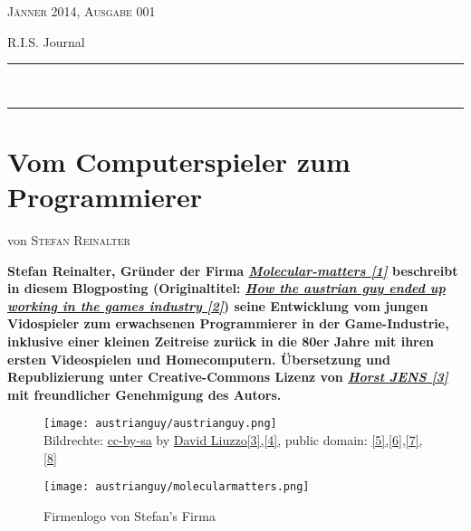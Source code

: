 \documentclass[10pt,a4paper,ngerman,twoside]{article} %
\newcommand{\HorRule}[1]{\noindent\rule{\linewidth}{#1}} %
\newcommand{\NewsletterName}[1]{ %
\begin{center}
\Huge \usefont{T1}{fvs}{b}{n} %
#1
\end{center}	
\par \normalsize \normalfont}
\newcommand{\JournalIssue}[1]{ %
\hfill \textsc{Jänner 2014, Ausgabe 001}
\par \normalsize \normalfont}
\newcommand{\NewsItem}[1]{ %
\usefont{T1}{fvs}{n}{n} %
\vspace{24pt}\large #1\vspace{3pt} %
\par \normalsize \normalfont}
\newcommand{\NewsAuthor}[1]{ %
\hfill von \textsc{#1} \vspace{20pt} %
\par \normalfont}
\begin{document}
\JournalIssue{1} %
\NewsletterName{R.I.S. Journal} %
\noindent\HorRule{3pt} \\[-0.75\baselineskip] %
\HorRule{1pt} %




%
 
\NewsItem{}
\section*{Vom Computerspieler zum Programmierer} 
\label{austrianguy}
\NewsAuthor{Stefan Reinalter}

\textbf{Stefan Reinalter, Gründer der Firma \href{http://www.molecular-matters.com/}{\textit{Molecular-matters [1]}} beschreibt in diesem Blogposting (Originaltitel: \href{http://www.altdevblogaday.com/2011/09/27/how-the-austrian-guy-ended-up-working-in-the-games-industry/}{\textit{How the austrian guy ended up working in the games industry [2]}}) seine Entwicklung vom jungen Vidospieler zum erwachsenen Programmierer in der Game-Industrie, inklusive einer kleinen Zeitreise zurück in die 80er Jahre mit ihren ersten Videospielen und Homecomputern. Übersetzung und Republizierung unter Creative-Commons Lizenz von \href{http://spielend-programmieren.at}{\textit{Horst JENS [3]}} mit freundlicher Genehmigung des Autors.}
\begin{figure}
\texttt{[image: austrianguy/austrianguy.png]} \\
\caption{Bildrechte: \href{https://creativecommons.org/licenses/by-sa/4.0/deed.en}{cc-by-sa} by \href{https://commons.wikimedia.org/wiki/User:David_Liuzzo}{David Liuzzo[3],}\href{https://commons.wikimedia.org/wiki/File:EU_location_AUT.png}{[4],} public domain: \href{http://openclipart.org/detail/175351/playstation-controller-by-matthewhenninger-175351}{[5],}\href{http://openclipart.org/detail/21847/comic-characters:-bearded-guy-by-nicubunu}{[6],}\href{http://openclipart.org/detail/7885/blue-world-map-by-neocreo}{[7],}\href{http://openclipart.org/detail/12612/flag-of-austria-by-anonymous}{[8]}}
\texttt{[image: austrianguy/molecularmatters.png]} \\
\caption{Firmenlogo von Stefan's Firma}
\end{figure}
\end{document}
